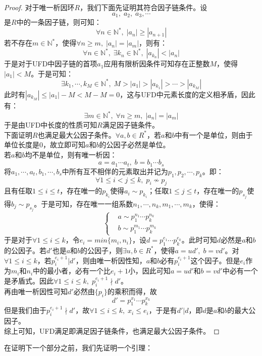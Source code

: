 \begin{proof}
\indent 对于唯一析因环$R$，我们下面先证明其符合因子链条件。设
\[
a_1,\; a_2,\; a_3,\cdots
\]
是$R$中的一条因子链，则可知：
\[
\forall n\in \mathbb{N}^* ,\; |a_n|\geq |a_{n+1}|
\]
若不存在$m\in \mathbb{N}^*$，使得$\forall n\geq m,\; |a_n|=|a_m|$，则有：
\[
\forall n\in \mathbb{N}^*,\; \exists k_n\in\mathbb{N}^*,\; |a_{k_n}|<|a_n|
\]
于是对于UFD中因子链的首项$a_1$应用有限析因条件可知存在正整数$M$，使得$|a_1|<M$。于是可知：
\[
\exists k_1,\cdots,k_M\in \mathbb{N}^*,\; M>|a_1|>|a_{k_1}|>\cdots>|a_{k_M}|
\]
此时有$|a_{k_M}|\leq|a_1|-M<M-M=0$，这与UFD中元素长度的定义相矛盾，因此有：
\[
\exists m\in \mathbb{N}^*,\; \forall n\geq m,\; |a_n|=|a_m|
\]
于是由UFD中长度的性质可知$R$满足因子链条件。\\
\indent 下面证明$R$也满足最大公因子条件。$\forall a,b\in R^*$，若$a$和$b$中有一个是单位，则由于单位长度是0，故立即可知$a$和$b$的公因子必然是单位。\\
若$a$和$b$均不是单位，则有唯一析因：
\[
a=a_1\cdots a_t,\; b=b_1\cdots b_s
\]
将$a_1,\cdots,a_t,b_1,\cdots,b_s$中所有互不相伴的元素取出并记为$p_1,p_2,\cdots,p_k$。即：
\[
\forall 1\leq i<j\leq k,\; p_i\nsim p_j
\]
\indent 且有任取$1\leq i\leq t$，存在唯一的$p_{k_i}$使得$a_i\sim p_{k_i}$；任取$1\leq j\leq t$，存在唯一的$p_{s_j}$使得$b_j\sim p_{s_j}$。于是可知，存在唯一一组系数$n_1,\cdots,n_k,m_1,\cdots,m_k$，使得：
\[
\left\{
\begin{aligned}
&a\sim p_1^{n_1}\cdots p_k^{n_k}\\
&b\sim p_1^{m_1}\cdots p_k^{m_k}
\end{aligned}\right.
\]
\indent 于是对于$\forall 1\leq i\leq k$，令$e_i=min\{m_i,n_i\}$，设$d=p_1^{e_1}\cdots p_k^{e_k}$。此时可知$d$必然是$a$和$b$的公因子。若$d'$也是$a$和$b$的公因子，则$\exists u,b\in R^*$，使得$a=ud',\; b=vd'$。对$\forall 1\leq i\leq k$，若$p_i^{e_i+1}|d'$，则由唯一析因性知，$a$和$b$必有$p_i^{e_i+1}$这个因子。但是$e_i$作为$m_i$和$n_i$中的最小者，必有一个比$e_i+1$小，因此可知$a=ud'$和$b=vd'$中必有一个是矛盾式。因此$\forall 1\leq i\leq k,\; p_i^{e_i+1}\nmid d'$。\\
\indent 再由唯一析因性可知$d'$必然由$\{p_i\}$的乘积而得，故
\[
d'=p_1^{x_1}\cdots p_k^{x_k}
\]
\indent 但是我们由于$p_i^{e_i+1}\nmid d'$，故$\forall 1\leq i\leq k,\; x_i\leq e_i$，于是有$d'|d$，即$d$是$a$和$b$的最大公因子。\\
综上可知，UFD满足即满足因子链条件，也满足最大公因子条件。
\end{proof}
在证明下一个部分之前，我们先证明一个引理：\\
